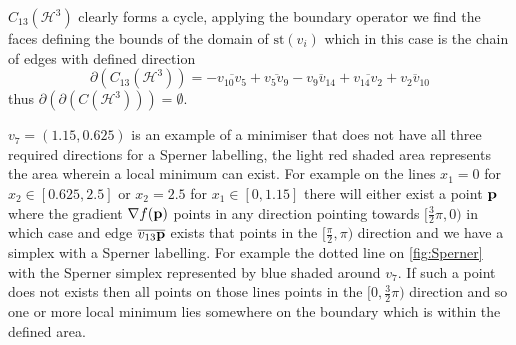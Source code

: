 $C_{13}(\mathcal{H}^3)$ clearly forms a cycle, applying the boundary operator we find the faces defining the bounds of the domain of $\textrm{st}\left( v_i \right)$ which in this case is the chain of edges with defined direction  $$\partial(C_{13}(\mathcal{H}^{3})) = - \overline{ v_{10} v_{5}} + \overline{v_{5} v_{9}} - \overline{v_{9} v_{14}} + \overline{v_{14} v_{2}} + \overline{v_{2} v_{10}} $$ thus $\partial\left(\partial(C(\mathcal{H}^{3}))\right) = \emptyset$. 

$v_{7} = (1.15, 0.625)$ is an example of a minimiser that does not have all three required directions for a Sperner labelling, the light red shaded area represents the area wherein a local minimum can exist. For example on the lines $x_1 = 0$ for $x_2 \in [0.625, 2.5]$ or $x_2 = 2.5$ for $x_1 \in [0, 1.15]$ there will either exist a point $\bold{p}$ where the gradient $\nabla f (\bold{p})$ points in any direction pointing towards $[\frac{3}{2} \pi, 0)$ in which case and edge $\overline{v_{13} \bold{p}}$ exists that points in the $[\frac{\pi}{2}, \pi)$ direction and we have a simplex with a Sperner labelling. For example the dotted line on \autoref{fig:Sperner} with the Sperner simplex represented by blue shaded around $v_7$. If such a point does not exists then all points on those lines points in the $[0, \frac{3}{2} \pi)$ direction and so one or more local minimum lies somewhere on the boundary which is within the defined area.


